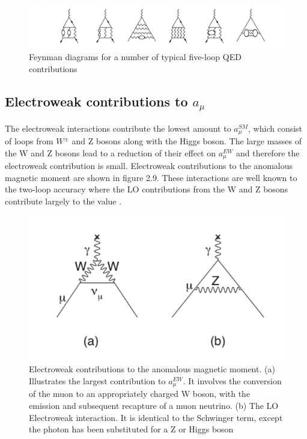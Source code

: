 \begin{figure}[th]
\centering
\includegraphics[scale=0.6]{Figures/QED5loop}
\decoRule
\caption{Feynman diagrams for a number of typical five-loop QED  contributions}
\label{fig:QED5loop}
\end{figure}

\subsection{Electroweak contributions to $a_{\mu}$}

The electroweak interactions contribute the lowest amount to $a_{\mu}^{SM}$, which consist of loops from $W^{\pm}$ and Z bosons along with the Higgs boson. The large masses of the W and Z bosons lead to a reduction of their effect on $a_{\mu}^{EW}$ and therefore the electroweak contribution is small. Electroweak contributions to the anomalous magnetic moment are shown in figure 2.9. These interactions are well known to the two-loop accuracy where the LO contributions from the W and Z bosons contribute largely to the value \cite{Reference18}\cite{Reference19}.

\begin{figure}[th]
\centering
\includegraphics[scale=0.7]{Figures/weakContribution}
\decoRule
\caption{Electroweak contributions to the anomalous magnetic moment. (a) Illustrates the largest contribution to $a_{\mu}^{EW}$. It involves the conversion of the muon to an appropriately charged W boson, with the emission and subsequent recapture of a muon neutrino. (b) The LO Electroweak interaction. It is identical to the Schwinger term, except the photon has been substituted for a Z or Higgs boson}
\label{fig:weakContribution}
\end{figure}


